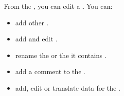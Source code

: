 
From the \gdtestcaseeditor{}, you can edit a \gdcase{}. You can:

\begin{itemize}
\item add other \gdcases{} .
\item add and edit \gdsteps{} .
\item rename the \gdcase{}  or the \gdcases{} it contains .
\item add a comment to the \gdcase{} .
\item add, edit or translate data for the \gdcase{} . 
\end{itemize}



